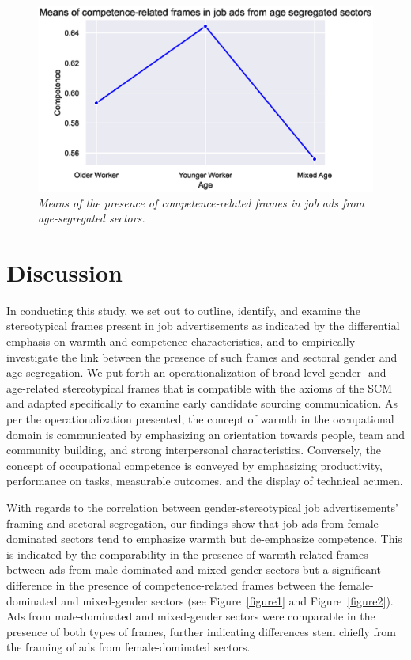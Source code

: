\documentclass[Royal,sageapa,times]{sagej}
\begin{document}
\begin{figure}[ht]
    \setlength{\fboxsep}{0pt}%
    \setlength{\fboxrule}{0pt}%
    \begin{center}
    \includegraphics[width=\textwidth]{FT/Figure4.eps}
    \end{center}
    \caption{\textit{Means of the presence of competence-related frames in job ads from age-segregated sectors.}}
    \label{figure4}
    \end{figure}

\clearpage
\section{Discussion\label{discussion}}
In conducting this study, we set out to outline, identify, and examine the stereotypical frames present in job advertisements as indicated by the differential emphasis on warmth and competence characteristics, and to empirically investigate the link between the presence of such frames and sectoral gender and age segregation. We put forth an operationalization of broad-level gender- and age-related stereotypical frames that is compatible with the axioms of the SCM and adapted specifically to examine early candidate sourcing communication. As per the operationalization presented, the concept of warmth in the occupational domain is communicated by emphasizing an orientation towards people, team and community building, and strong interpersonal characteristics. Conversely, the concept of occupational competence is conveyed by emphasizing productivity, performance on tasks, measurable outcomes, and the display of technical acumen.

With regards to the correlation between gender-stereotypical job advertisements’ framing and sectoral segregation, our findings show that job ads from female-dominated sectors tend to emphasize warmth but de-emphasize competence. This is indicated by the comparability in the presence of warmth-related frames between ads from male-dominated and mixed-gender sectors but a significant difference in the presence of competence-related frames between the female-dominated and mixed-gender sectors (see Figure~\ref{figure1} and Figure~\ref{figure2}). Ads from male-dominated and mixed-gender sectors were comparable in the presence of both types of frames, further indicating differences stem chiefly from the framing of ads from female-dominated sectors.
\end{document}
